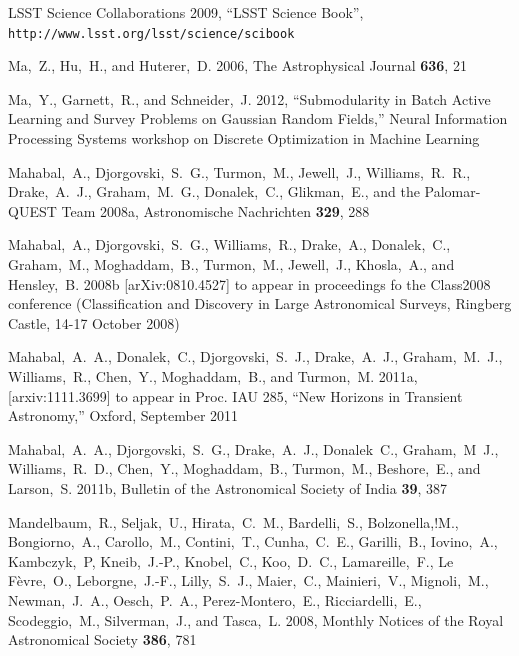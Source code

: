 \documentclass[prd, nofootinbib, floatfix, 12pt,tightenlines]{revtex4}
\begin{document}
\begin{thebibliography}{99}
LSST Science Collaborations 2009, ``LSST Science Book'',
\verb|http://www.lsst.org/lsst/science/scibook|

Ma,~Z., Hu,~H., and Huterer,~D. 2006, The Astrophysical Journal {\bf 636}, 21

Ma,~Y., Garnett,~R., and Schneider,~J. 2012,
``Submodularity in Batch Active Learning and Survey Problems
on Gaussian Random Fields,''
Neural Information Processing Systems 
workshop on Discrete Optimization in Machine Learning

Mahabal,~A., Djorgovski,~S.~G., Turmon,~M., Jewell,~J., Williams,~R.~R.,
Drake,~A.~J., Graham,~M.~G., Donalek,~C., Glikman,~E., and the Palomar-QUEST Team
2008a, Astronomische Nachrichten {\bf 329}, 288

Mahabal,~A., Djorgovski,~S.~G., Williams,~R., Drake,~A., Donalek,~C.,
Graham,~M., Moghaddam,~B., Turmon,~M., Jewell,~J., Khosla,~A., and
Hensley,~B. 2008b [arXiv:0810.4527] to appear in proceedings fo the Class2008
conference (Classification and Discovery in Large Astronomical Surveys, Ringberg
Castle, 14-17 October 2008)

Mahabal,~A.~A., Donalek,~C., Djorgovski,~S.~J., Drake,~A.~J.,
Graham,~M.~J., Williams,~R., Chen,~Y., Moghaddam,~B., and Turmon,~M.
2011a, [arxiv:1111.3699] to appear in Proc. IAU 285, ``New Horizons in Transient
Astronomy,'' Oxford, September 2011

Mahabal,~A.~A., Djorgovski,~S.~G., Drake,~A.~J., Donalek~C., Graham,~M~J.,
Williams,~R.~D., Chen,~Y., Moghaddam,~B., Turmon,~M., Beshore,~E., and Larson,~S.
2011b, Bulletin of the Astronomical Society of India {\bf 39}, 387

Mandelbaum,~R., Seljak,~U., Hirata,~C.~M., Bardelli,~S., Bolzonella,!M.,
Bongiorno,~A., Carollo,~M., Contini,~T., Cunha,~C.~E., Garilli,~B.,
Iovino,~A., Kambczyk,~P, Kneib,~J.-P., Knobel,~C., Koo,~D.~C., Lamareille,~F.,
Le F\`evre,~O., Leborgne,~J.-F., Lilly,~S.~J., Maier,~C., Mainieri,~V.,
Mignoli,~M., Newman,~J.~A., Oesch,~P.~A., Perez-Montero,~E., Ricciardelli,~E.,
Scodeggio,~M., Silverman,~J., and Tasca,~L. 2008, Monthly Notices of the Royal
Astronomical Society {\bf 386}, 781


\end{thebibliography}
\end{document}
